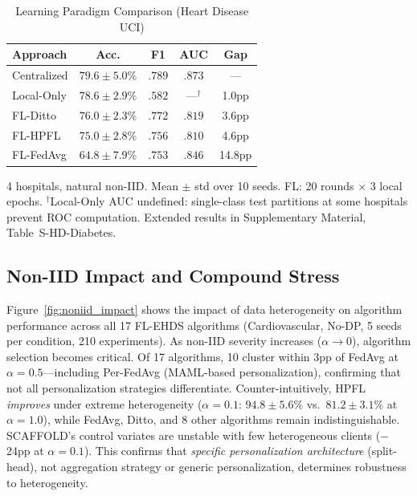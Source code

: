 \documentclass[conference]{IEEEtran}
\begin{document}
\begin{table}[htbp]
\centering
\caption{Learning Paradigm Comparison (Heart Disease UCI)}
\label{tab:fl_vs_central}
\small
\begin{tabular}{lcccc}
\toprule
\textbf{Approach} & \textbf{Acc.} & \textbf{F1} & \textbf{AUC} & \textbf{Gap} \\
\midrule
Centralized & $79.6 \pm 5.0$\% & $.789$ & $.873$ & --- \\
Local-Only & $78.6 \pm 2.9$\% & $.582$ & ---$^\dagger$ & 1.0pp \\
FL-Ditto & $76.0 \pm 2.3$\% & $.772$ & $.819$ & 3.6pp \\
FL-HPFL & $75.0 \pm 2.8$\% & $.756$ & $.810$ & 4.6pp \\
FL-FedAvg & $64.8 \pm 7.9$\% & $.753$ & $.846$ & 14.8pp \\
\bottomrule
\end{tabular}

\vspace{1mm}
\footnotesize{4 hospitals, natural non-IID. Mean $\pm$ std over 10 seeds. FL: 20 rounds $\times$ 3 local epochs. $^\dagger$Local-Only AUC undefined: single-class test partitions at some hospitals prevent ROC computation. Extended results in Supplementary Material, Table~S-HD-Diabetes.}
\end{table}

\subsection{Non-IID Impact and Compound Stress}

Figure~\ref{fig:noniid_impact} shows the impact of data heterogeneity on algorithm performance across all 17 FL-EHDS algorithms (Cardiovascular, No-DP, 5 seeds per condition, 210 experiments). As non-IID severity increases ($\alpha \to 0$), algorithm selection becomes critical. Of 17 algorithms, 10 cluster within 3pp of FedAvg at $\alpha{=}0.5$---including Per-FedAvg (MAML-based personalization), confirming that not all personalization strategies differentiate. Counter-intuitively, HPFL \textit{improves} under extreme heterogeneity ($\alpha{=}0.1$: $94.8 \pm 5.6$\% vs.\ $81.2 \pm 3.1$\% at $\alpha{=}1.0$), while FedAvg, Ditto, and 8 other algorithms remain indistinguishable. SCAFFOLD's control variates are unstable with few heterogeneous clients ($-$24pp at $\alpha{=}0.1$). This confirms that \textit{specific personalization architecture} (split-head), not aggregation strategy or generic personalization, determines robustness to heterogeneity.
\end{document}
